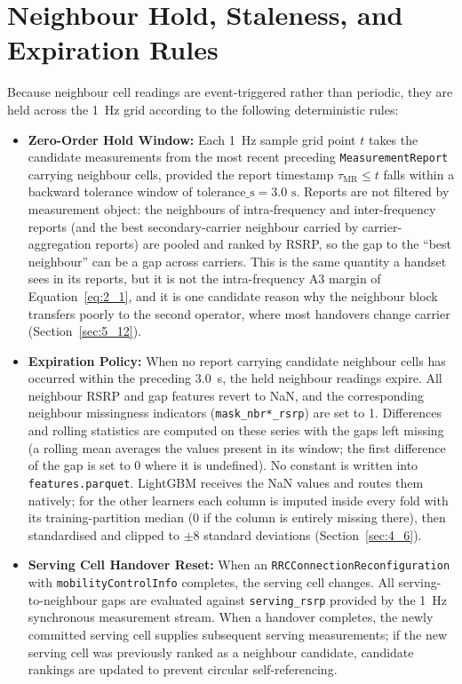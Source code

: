 \section{Neighbour Hold, Staleness, and Expiration Rules}
Because neighbour cell readings are event-triggered rather than periodic, they are held across the 1~Hz grid according to the following deterministic rules:
\begin{itemize}
    \item \textbf{Zero-Order Hold Window:} Each 1~Hz sample grid point $t$ takes the candidate measurements from the most recent preceding \texttt{MeasurementReport} carrying neighbour cells, provided the report timestamp $\tau_{\text{MR}} \le t$ falls within a backward tolerance window of $\text{tolerance\_s} = 3.0\text{ s}$. Reports are not filtered by measurement object: the neighbours of intra-frequency and inter-frequency reports (and the best secondary-carrier neighbour carried by carrier-aggregation reports) are pooled and ranked by RSRP, so the gap to the ``best neighbour'' can be a gap across carriers. This is the same quantity a handset sees in its reports, but it is not the intra-frequency A3 margin of Equation~\eqref{eq:2_1}, and it is one candidate reason why the neighbour block transfers poorly to the second operator, where most handovers change carrier (Section~\ref{sec:5_12}).
    \item \textbf{Expiration Policy:} When no report carrying candidate neighbour cells has occurred within the preceding 3.0~s, the held neighbour readings expire. All neighbour RSRP and gap features revert to NaN, and the corresponding neighbour missingness indicators (\texttt{mask\_nbr*\_rsrp}) are set to 1. Differences and rolling statistics are computed on these series with the gaps left missing (a rolling mean averages the values present in its window; the first difference of the gap is set to 0 where it is undefined). No constant is written into \texttt{features.parquet}. LightGBM receives the NaN values and routes them natively; for the other learners each column is imputed inside every fold with its training-partition median (0 if the column is entirely missing there), then standardised and clipped to $\pm 8$ standard deviations (Section~\ref{sec:4_6}).
    \item \textbf{Serving Cell Handover Reset:} When an \texttt{RRCConnectionReconfiguration} with \texttt{mobilityControlInfo} completes, the serving cell changes. All serving-to-neighbour gaps are evaluated against \texttt{serving\_rsrp} provided by the 1~Hz synchronous measurement stream. When a handover completes, the newly committed serving cell supplies subsequent serving measurements; if the new serving cell was previously ranked as a neighbour candidate, candidate rankings are updated to prevent circular self-referencing.

\end{itemize}
